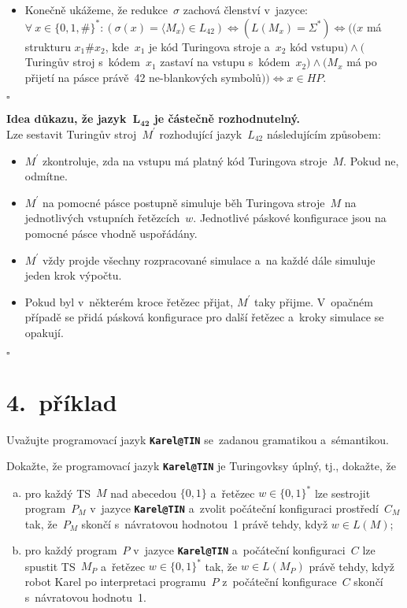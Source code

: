 \documentclass[a4paper, 11pt]{scrartcl}
\newcommand*{\QEDB}{\hfill\ensuremath{\square}}
\begin{document}
\begin{itemize}
		\item
			Konečně ukážeme, že redukce~$ \sigma $ zachová členství
			v~jazyce: \\
			$ \forall\ x \in \{0, 1, \#\}^* : (\sigma(x) = \langle
			M_x \rangle \in L_{42}) \Leftrightarrow (L(M_x) =
			\Sigma^*) \Leftrightarrow ((x $ má strukturu $ x_1\#x_2 $,
			kde~$ x_1 $ je kód Turingova stroje a~$ x_2 $ kód vstupu$
			) \wedge ( $Turingův stroj s~kódem~$ x_1 $ zastaví na
			vstupu s~kódem~$ x_2) \wedge (M_x $ má po přijetí na
			pásce právě~42 ne-blankových symbolů$ )) \Leftrightarrow
			x \in HP $.
	\end{itemize}
	\QEDB

	\textbf{%
		Idea důkazu, že jazyk~$ \boldsymbol{L_{42}} $ je  částečně
		rozhodnutelný.
	} \\
	Lze sestavit Turingův stroj~$ M^\prime $ rozhodující
	jazyk~$ L_{42} $ následujícím způsobem:
	\begin{itemize}
		\item
			$ M^\prime $ zkontroluje, zda na vstupu má platný kód
			Turingova stroje~$ M $. Pokud ne, odmítne.

		\item
			$ M^\prime $ na pomocné pásce postupně simuluje běh
			Turingova stroje~$ M $ na jednotlivých vstupních
			řetězcích~$ w $. Jednotlivé páskové konfigurace jsou
			na pomocné pásce vhodně uspořádány.

		\item
			$ M^\prime $ vždy projde všechny rozpracované simulace
			a~na každé dále simuluje jeden krok výpočtu.

		\item
			Pokud byl v~některém kroce řetězec přijat, $ M^\prime $
			taky přijme. V~opačném případě se přidá pásková konfigurace
			pro další řetězec a~kroky simulace se opakují.
	\end{itemize}
	\QEDB


	\section*{4.~příklad}

	Uvažujte programovací jazyk \textbf{\texttt{Karel@TIN}}
	se~zadanou gramatikou a~sémantikou.

	Dokažte, že programovací jazyk \textbf{\texttt{Karel@TIN}} je
	Turingovksy úplný, tj., dokažte, že
	\begin{enumerate}[(a)]
		\item
			pro každý TS~$ M $ nad abecedou $ \{0, 1\} $ a~řetězec
			$ w \in \{0, 1\}^* $ lze sestrojit program~$ P_M $
			v~jazyce \textbf{\texttt{Karel@TIN}} a~zvolit
			počáteční konfiguraci prostředí~$ C_M $ tak, že~$ P_M $
			skončí s~návratovou hodnotou~1 právě tehdy, když
			$ w \in L(M) $;

		\item
			pro každý program~$ P $ v~jazyce \textbf{\texttt{Karel@TIN}}
			a~počáteční konfiguraci~$ C $ lze spustit TS~$ M_P $
			a~řetězec $ w \in \{0, 1\}^* $ tak, že $ w \in L(M_P) $
			právě tehdy, když robot Karel po interpretaci programu~$ P $
			z~počáteční konfigurace~$ C $ skončí s~návratovou
			hodnotu~1.
	\end{enumerate}
\end{document}
